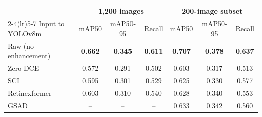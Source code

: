 \begin{tabular}{l ccc ccc}
\toprule
 & \multicolumn{3}{c}{1{,}200 images} & \multicolumn{3}{c}{200-image subset} \\
\cmidrule(lr){2-4}\cmidrule(lr){5-7}
Input to YOLOv8m & mAP50 & mAP50-95 & Recall & mAP50 & mAP50-95 & Recall \\
\midrule
Raw (no enhancement) & \textbf{0.662} & \textbf{0.345} & \textbf{0.611} & \textbf{0.707} & \textbf{0.378} & \textbf{0.637} \\
Zero-DCE & 0.572 & 0.291 & 0.502 & 0.603 & 0.317 & 0.513 \\
SCI & 0.595 & 0.301 & 0.529 & 0.625 & 0.330 & 0.577 \\
Retinexformer & 0.603 & 0.310 & 0.540 & 0.628 & 0.340 & 0.553 \\
GSAD & -- & -- & -- & 0.633 & 0.342 & 0.560 \\
\bottomrule
\end{tabular}
